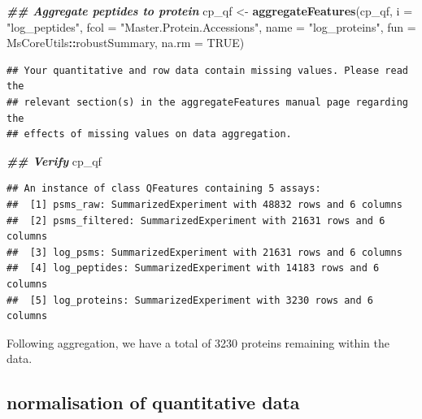 \documentclass[9pt,a4paper,]{extarticle}
\newenvironment{Shaded}{\begin{snugshade}}{\end{snugshade}}
\newcommand{\AttributeTok}[1]{\textcolor[rgb]{0.13,0.29,0.53}{#1}}
\newcommand{\ConstantTok}[1]{\textcolor[rgb]{0.56,0.35,0.01}{#1}}
\newcommand{\DocumentationTok}[1]{\textcolor[rgb]{0.56,0.35,0.01}{\textbf{\textit{#1}}}}
\newcommand{\FunctionTok}[1]{\textcolor[rgb]{0.13,0.29,0.53}{\textbf{#1}}}
\newcommand{\NormalTok}[1]{#1}
\newcommand{\OtherTok}[1]{\textcolor[rgb]{0.56,0.35,0.01}{#1}}
\newcommand{\SpecialCharTok}[1]{\textcolor[rgb]{0.81,0.36,0.00}{\textbf{#1}}}
\newcommand{\StringTok}[1]{\textcolor[rgb]{0.31,0.60,0.02}{#1}}
\begin{document}
\begin{Shaded}
\begin{Highlighting}[]
\DocumentationTok{\#\# Aggregate peptides to protein}
\NormalTok{cp\_qf }\OtherTok{\textless{}{-}} \FunctionTok{aggregateFeatures}\NormalTok{(cp\_qf,}
                           \AttributeTok{i =} \StringTok{"log\_peptides"}\NormalTok{,}
                           \AttributeTok{fcol =} \StringTok{"Master.Protein.Accessions"}\NormalTok{,}
                           \AttributeTok{name =} \StringTok{"log\_proteins"}\NormalTok{,}
                           \AttributeTok{fun =}\NormalTok{ MsCoreUtils}\SpecialCharTok{::}\NormalTok{robustSummary,}
                           \AttributeTok{na.rm =} \ConstantTok{TRUE}\NormalTok{)}
\end{Highlighting}
\end{Shaded}

\begin{verbatim}
## Your quantitative and row data contain missing values. Please read the
## relevant section(s) in the aggregateFeatures manual page regarding the
## effects of missing values on data aggregation.
\end{verbatim}

\begin{Shaded}
\begin{Highlighting}[]
\DocumentationTok{\#\# Verify}
\NormalTok{cp\_qf}
\end{Highlighting}
\end{Shaded}

\begin{verbatim}
## An instance of class QFeatures containing 5 assays:
##  [1] psms_raw: SummarizedExperiment with 48832 rows and 6 columns 
##  [2] psms_filtered: SummarizedExperiment with 21631 rows and 6 columns 
##  [3] log_psms: SummarizedExperiment with 21631 rows and 6 columns 
##  [4] log_peptides: SummarizedExperiment with 14183 rows and 6 columns 
##  [5] log_proteins: SummarizedExperiment with 3230 rows and 6 columns
\end{verbatim}

Following aggregation, we have a total of 3230
proteins remaining within the data.

\subsection{normalisation of quantitative data}\label{normalisation-of-quantitative-data}
\end{document}
